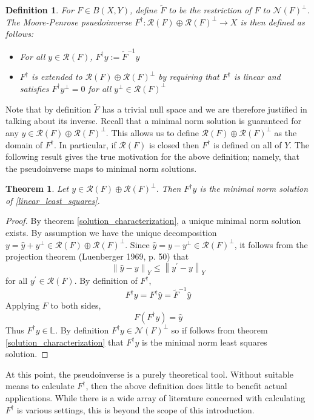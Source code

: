 \documentclass[12pt]{article}
\newcommand*{\norm}[1]{\left\lVert#1\right\rVert}
\newcommand{\R}{\mathcal{R}}
\newcommand{\N}{\mathcal{N}}
\newtheorem{definition}{Definition}
\newtheorem{thm}{Theorem}
\begin{document}
 \begin{definition} 
 For $F \in B(X, Y)$, define $\tilde{F}$ to be the restriction of $F$ to $\N(F)^\perp$. The Moore-Penrose psuedoinverse $F^\dagger : \R(F) \oplus \R(F)^\perp \to X$ is then defined as follows: 
 \begin{itemize} 
 \item For all $y \in \R(F)$, $F^\dagger y := \tilde{F}^{-1}y$
 \item $F^\dagger$ is extended to $\R(F) \oplus \R(F)^\perp$ by requiring that $F^\dagger$ is linear and satisfies $F^\dagger y^\perp = 0$ for all $y^\perp \in \R(F)^\perp$
 \end{itemize} 
 \end{definition} 
 
Note that by definition $\tilde{F}$ has a trivial null space and we are therefore justified in talking 
about its inverse. Recall that a minimal norm solution is guaranteed for any $y \in \R(F) \oplus \R(F)^\perp$. 
This allows us to define $\R(F) \oplus \R(F)^\perp$ as the domain of $F^\dagger$. In particular, if $\R(F)$ is closed then $F^\dagger$ 
is defined on all of $Y$. The following result gives the true motivation for the above definition; namely, that the pseudoinverse maps 
to minimal norm solutions.

\begin{thm} 
Let $y \in \R(F) \oplus \R(F)^\perp$. Then $F^\dagger y$ is the minimal norm solution of \eqref{linear_least_squares}. 
\end{thm} 

\begin{proof} 
By theorem \ref{solution_characterization}, a unique minimal norm solution exists. By assumption we have the 
unique decomposition $y = \hat{y} + y^\perp \in \R(F) \oplus \R(F)^\perp$. Since $\hat{y} = y - y^\perp \in \R(F)^\perp$, 
it follows from the projection theorem (Luenberger 1969, p. 50) that \[\norm{\hat{y} - y}_Y \leq \norm{y^\prime - y}_Y\]
for all $y^\prime \in \R(F)$. By definition of $F^\dagger$, 
\[F^\dagger y = F^\dagger \hat{y} = \tilde{F}^{-1}\hat{y}\]
Applying $F$ to both sides, 
\[F(F^\dagger y) = \hat{y}\]
Thus $F^\dagger y \in \mathbb{L}$. By definition $F^\dagger y \in \N(F)^\perp$ so if follows from 
theorem \ref{solution_characterization} that $F^\dagger y$ is the minimal norm least squares solution. 
\end{proof} 

At this point, the pseudoinverse is a purely theoretical tool. Without suitable means to calculate $F^\dagger$, then 
the above definition does little to benefit actual applications. While there is a wide array of literature concerned with 
calculating $F^\dagger$ is various settings, this is beyond the scope of this introduction. 
\end{document}
